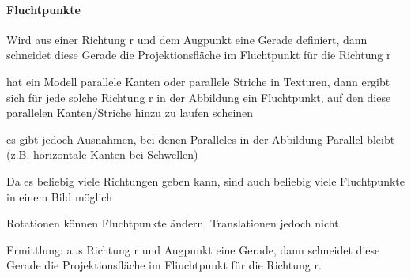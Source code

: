 \documentclass[landscape]{article}
\begin{document}
\begin{multicols}{3}
  \paragraph{Fluchtpunkte}
  \begin{itemize*}
    \item Wird aus einer Richtung r und dem Augpunkt eine Gerade definiert, dann schneidet diese Gerade die Projektionsfläche im Fluchtpunkt für die Richtung r
    \item hat ein Modell parallele Kanten oder parallele Striche in Texturen, dann ergibt sich für jede solche Richtung r in der Abbildung ein Fluchtpunkt, auf den diese parallelen Kanten/Striche hinzu zu laufen scheinen
    \item es gibt jedoch Ausnahmen, bei denen Paralleles in der Abbildung Parallel bleibt (z.B. horizontale Kanten bei Schwellen)
    \item Da es beliebig viele Richtungen geben kann, sind auch beliebig viele Fluchtpunkte in einem Bild möglich
    \item Rotationen können Fluchtpunkte ändern, Translationen jedoch nicht
    \item Ermittlung: aus Richtung r und Augpunkt eine Gerade, dann schneidet diese Gerade die Projektionsfläche im Fliuchtpunkt für die Richtung r.
  \end{itemize*}
  
\end{multicols}
\newpage
\end{document}
